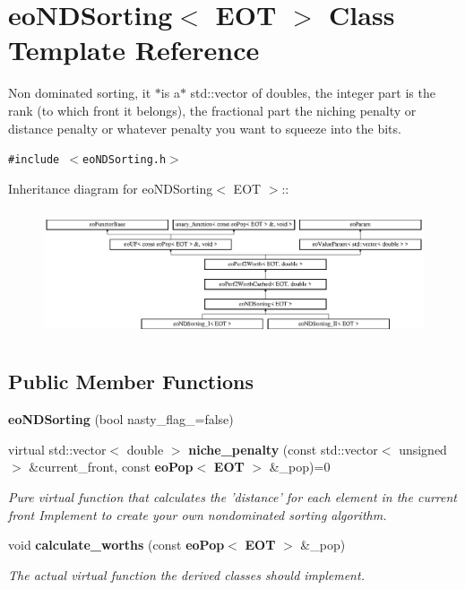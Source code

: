 \section{eo\-NDSorting$<$ EOT $>$ Class Template Reference}
\label{classeo_n_d_sorting}
Non dominated sorting, it $\ast$is a$\ast$ std::vector of doubles, the integer part is the rank (to which front it belongs), the fractional part the niching penalty or distance penalty or whatever penalty you want to squeeze into the bits.  


{\tt \#include $<$eo\-NDSorting.h$>$}

Inheritance diagram for eo\-NDSorting$<$ EOT $>$::\begin{figure}[H]
\begin{center}
\leavevmode
\includegraphics[height=3.78378cm]{classeo_n_d_sorting}
\end{center}
\end{figure}
\subsection*{Public Member Functions}
\begin{CompactItemize}
\item 
{\bf eo\-NDSorting} (bool nasty\_\-flag\_\-=false)\label{classeo_n_d_sorting_a0}

\item 
virtual std::vector$<$ double $>$ {\bf niche\_\-penalty} (const std::vector$<$ unsigned $>$ \&current\_\-front, const {\bf eo\-Pop}$<$ {\bf EOT} $>$ \&\_\-pop)=0
\begin{CompactList}\small\item\em Pure virtual function that calculates the 'distance' for each element in the current front Implement to create your own nondominated sorting algorithm. \item\end{CompactList}\item 
void {\bf calculate\_\-worths} (const {\bf eo\-Pop}$<$ {\bf EOT} $>$ \&\_\-pop)\label{classeo_n_d_sorting_a3}

\begin{CompactList}\small\item\em The actual virtual function the derived classes should implement. \item\end{CompactList}\end{CompactItemize}
